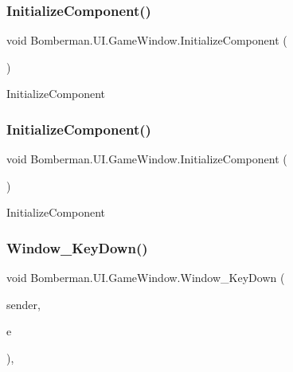 \subsubsection{\texorpdfstring{InitializeComponent()}{InitializeComponent()}\hspace{0.1cm}{\footnotesize\ttfamily [1/2]}}
{\footnotesize\ttfamily void Bomberman.\+U\+I.\+Game\+Window.\+Initialize\+Component (\begin{DoxyParamCaption}{ }\end{DoxyParamCaption})\hspace{0.3cm}{\ttfamily [inline]}}



Initialize\+Component 

\mbox{\label{class_bomberman_1_1_u_i_1_1_game_window_a8a7ee739b5c6cc202006ab127e280afd}} 
\subsubsection{\texorpdfstring{InitializeComponent()}{InitializeComponent()}\hspace{0.1cm}{\footnotesize\ttfamily [2/2]}}
{\footnotesize\ttfamily void Bomberman.\+U\+I.\+Game\+Window.\+Initialize\+Component (\begin{DoxyParamCaption}{ }\end{DoxyParamCaption})\hspace{0.3cm}{\ttfamily [inline]}}



Initialize\+Component 

\mbox{\label{class_bomberman_1_1_u_i_1_1_game_window_adf71feba9c454450bc901263aa93e442}} 
\subsubsection{\texorpdfstring{Window\_KeyDown()}{Window\_KeyDown()}}
{\footnotesize\ttfamily void Bomberman.\+U\+I.\+Game\+Window.\+Window\+\_\+\+Key\+Down (\begin{DoxyParamCaption}\item[{object}]{sender,  }\item[{Key\+Event\+Args}]{e }\end{DoxyParamCaption})\hspace{0.3cm}{\ttfamily [inline]}, {\ttfamily [private]}}



